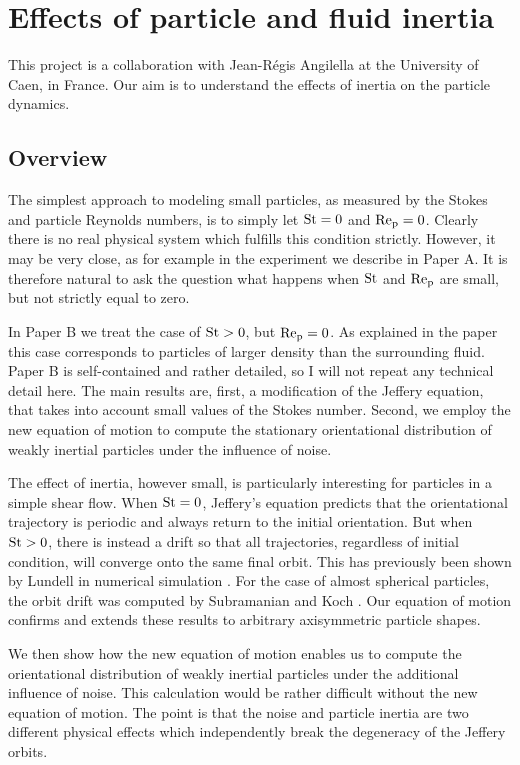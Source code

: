 \documentclass[thesis.tex]{subfiles}
\begin{document}
\chapter{Effects of particle and fluid inertia}

This project is a collaboration with Jean-R\'egis Angilella at the University of Caen, in France. Our aim is to understand the effects of inertia on the particle dynamics.

\section{Overview}

The simplest approach to modeling small particles, as measured by the Stokes and particle Reynolds numbers, is to simply let $\mbox{St}=0$ and $\mbox{Re}_{\mathrm p}=0$. Clearly there is no real physical system which fulfills this condition strictly. However, it may be very close, as for example in the experiment we describe in Paper A. It is therefore natural to ask the question what happens when $\mbox{St}$ and $\mbox{Re}_{\mathrm p}$ are small, but not strictly equal to zero.

In Paper B we treat the case of $\mbox{St}>0$, but $\mbox{Re}_{\mathrm p}=0$. As explained in the paper this case corresponds to particles of larger density than the surrounding fluid. Paper B is self-contained and rather detailed, so I will not repeat any technical detail here. The main results are, first, a modification of the Jeffery equation, that takes into account small values of the Stokes number. Second, we employ the new equation of motion to compute the stationary orientational distribution of weakly inertial particles under the influence of noise. 

The effect of inertia, however small, is particularly interesting for particles in a simple shear flow. When $\mbox{St}=0$, Jeffery's equation predicts that the orientational trajectory is periodic and always return to the initial orientation. But when $\mbox{St}>0$, there is instead a drift so that all trajectories, regardless of initial condition, will converge onto the same final orbit. This has previously been shown by Lundell in numerical simulation \cite{lundell2010}. For the case of almost spherical particles, the orbit drift was computed by Subramanian and Koch \cite{subramanian2006}. Our equation of motion confirms and extends these results to arbitrary axisymmetric particle shapes.

We then show how the new equation of motion enables us to compute the orientational distribution of weakly inertial particles under the additional influence of noise. This calculation would be rather difficult without the new equation of motion. The point is that the noise and particle inertia are two different physical effects which independently break the degeneracy of the Jeffery orbits. 
\end{document}

